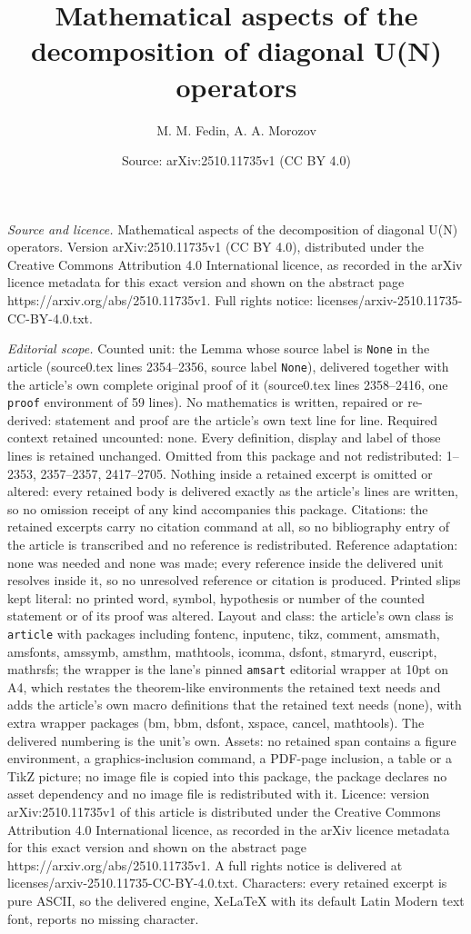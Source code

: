 \documentclass[10pt,a4paper]{amsart}
\title[Mathematical aspects of the decomposition of diagonal U(N) o]{Mathematical aspects of the decomposition of diagonal U(N) operators}
\author{M. M. Fedin, A. A. Morozov}
\date{Source: arXiv:2510.11735v1 (CC BY 4.0)}
\begin{document}
\maketitle

\noindent\emph{Source and licence.} Mathematical aspects of the decomposition of diagonal U(N) operators. Version arXiv:2510.11735v1 (CC BY 4.0), distributed under the Creative Commons Attribution 4.0 International licence, as recorded in the arXiv licence metadata for this exact version and shown on the abstract page https://arxiv.org/abs/2510.11735v1. Full rights notice: licenses/arxiv-2510.11735-CC-BY-4.0.txt.\par\smallskip

\noindent\textit{Editorial scope.} Counted unit: the Lemma whose source label is \texttt{None} in the article (source0.tex lines 2354--2356, source label \texttt{None}), delivered together with the article's own complete original proof of it (source0.tex lines 2358--2416, one \texttt{proof} environment of 59 lines). No mathematics is written, repaired or re-derived: statement and proof are the article's own text line for line. Required context retained uncounted: none. Every definition, display and label of those lines is retained unchanged. Omitted from this package and not redistributed: 1--2353, 2357--2357, 2417--2705. Nothing inside a retained excerpt is omitted or altered: every retained body is delivered exactly as the article's lines are written, so no omission receipt of any kind accompanies this package. Citations: the retained excerpts carry no citation command at all, so no bibliography entry of the article is transcribed and no reference is redistributed. Reference adaptation: none was needed and none was made; every reference inside the delivered unit resolves inside it, so no unresolved reference or citation is produced. Printed slips kept literal: no printed word, symbol, hypothesis or number of the counted statement or of its proof was altered. Layout and class: the article's own class is \texttt{article} with packages including fontenc, inputenc, tikz, comment, amsmath, amsfonts, amssymb, amsthm, mathtools, icomma, dsfont, stmaryrd, euscript, mathrsfs; the wrapper is the lane's pinned \texttt{amsart} editorial wrapper at 10pt on A4, which restates the theorem-like environments the retained text needs and adds the article's own macro definitions that the retained text needs (none), with extra wrapper packages (bm, bbm, dsfont, xspace, cancel, mathtools). The delivered numbering is the unit's own. Assets: no retained span contains a figure environment, a graphics-inclusion command, a PDF-page inclusion, a table or a TikZ picture; no image file is copied into this package, the package declares no asset dependency and no image file is redistributed with it. Licence: version arXiv:2510.11735v1 of this article is distributed under the Creative Commons Attribution 4.0 International licence, as recorded in the arXiv licence metadata for this exact version and shown on the abstract page https://arxiv.org/abs/2510.11735v1. A full rights notice is delivered at licenses/arxiv-2510.11735-CC-BY-4.0.txt. Characters: every retained excerpt is pure ASCII, so the delivered engine, XeLaTeX with its default Latin Modern text font, reports no missing character.
\end{document}
